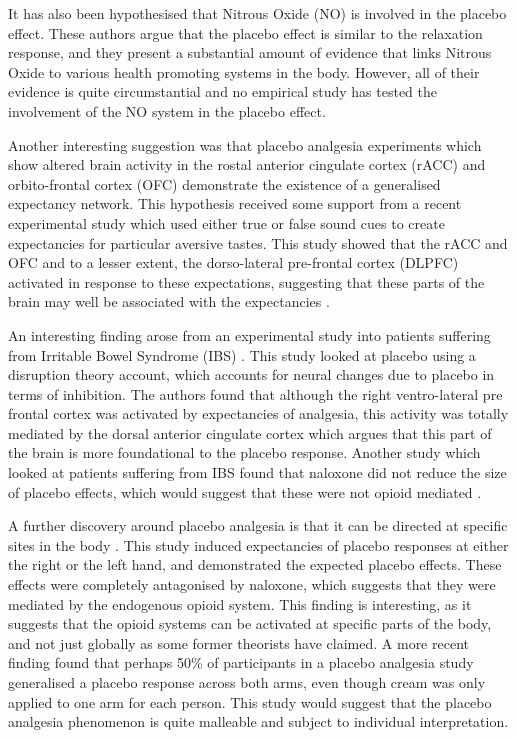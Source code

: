 It has also been hypothesised \cite{Stefano2001,Fricchione2005} that Nitrous Oxide (NO) is involved in the placebo effect. These authors argue that the placebo effect is similar to the relaxation response, and they present a substantial amount of evidence that links Nitrous Oxide to various health promoting systems in the body. However, all of their evidence is quite circumstantial and no empirical study has tested the involvement of the NO system in the placebo effect. 

Another interesting suggestion was that placebo analgesia experiments which show altered brain activity in the rostal anterior cingulate cortex (rACC) and orbito-frontal cortex (OFC) demonstrate the existence of a generalised expectancy network. This hypothesis received some support from a recent experimental study which used either true or false sound cues to create expectancies for particular aversive tastes. This study showed that the rACC and OFC and to a lesser extent, the dorso-lateral pre-frontal cortex (DLPFC) activated in response to these expectations, suggesting that these parts of the brain may well be associated with the expectancies  \cite{Sarinopoulos2006}. 
 
An interesting finding arose from an experimental study into patients suffering from Irritable Bowel Syndrome (IBS) \cite{Lieberman2004}. This study looked at placebo using a disruption theory account, which accounts for neural changes due to placebo in terms of inhibition. The authors found that although the right ventro-lateral pre frontal cortex was activated by expectancies of analgesia, this activity was totally mediated by the dorsal anterior cingulate cortex which argues that this part of the brain is more foundational to the placebo response.  Another study which looked at patients suffering from IBS found that naloxone did not reduce the size of placebo effects, which would suggest that these were not opioid mediated \cite{Vase2005}.

A further discovery around placebo analgesia is that it can be directed at specific sites in the body \cite{Benedetti1999}. This study induced expectancies of placebo responses at either the right or the left hand, and demonstrated the expected placebo effects. These effects were completely antagonised by naloxone, which suggests that they were mediated by the endogenous opioid system. This finding is interesting, as it suggests that the opioid systems can be activated at specific parts of the body, and not just globally as some former theorists have claimed. A more recent finding \cite{Watson2006} found that perhaps 50\% of participants in a placebo analgesia study generalised a placebo response across both arms, even though cream was only applied to one arm for each person. This study would suggest that the placebo analgesia phenomenon is quite malleable and subject to individual interpretation. 

